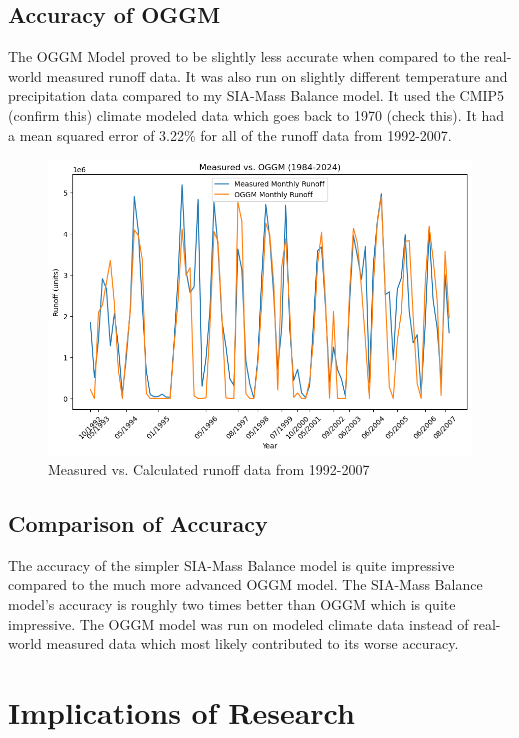 \documentclass{article}
\begin{document}
\subsection{Accuracy of OGGM}
The OGGM Model proved to be slightly less accurate when compared to the real-world measured runoff data. It was also run on slightly different 
temperature and precipitation data compared to my SIA-Mass Balance model. It used the CMIP5 (confirm this) climate modeled data which goes 
back to 1970 (check this). It had a mean squared error of 3.22\% for all of the runoff data from 1992-2007.
\begin{figure}[h!]
    \centering
    \includegraphics[width=\textwidth]{Plots/oggm_vs_measured.png}
    \caption{Measured vs. Calculated runoff data from 1992-2007}
    \label{fig:oggm_vs_measured}
\end{figure}
\FloatBarrier
\subsection{Comparison of Accuracy}
The accuracy of the simpler SIA-Mass Balance model is quite impressive compared to the much more advanced OGGM model. The SIA-Mass Balance 
model's accuracy is roughly two times better than OGGM which is quite impressive. The OGGM model was run on modeled climate data instead of 
real-world measured data which most likely contributed to its worse accuracy. 
\section{Implications of Research}
\end{document}
